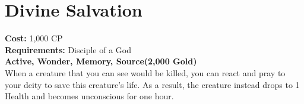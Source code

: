 \section{Divine Salvation}\label{wonder:divineSalvation}
\textbf{Cost:} 1,000 CP\\
\textbf{Requirements:} Disciple of a God\\
\textbf{Active, Wonder, Memory, Source(2,000 Gold)}\\
When a creature that you can see would be killed, you can react and pray to your deity to save this creature's life.
As a result, the creature instead drops to 1 Health and becomes unconscious for one hour.
\\